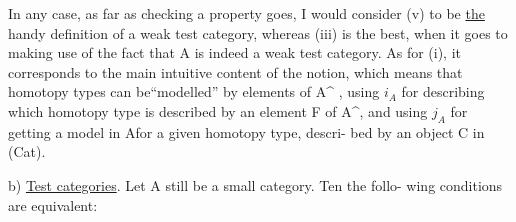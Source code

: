 In any case,  as far as checking a property goes,  I would consider
(v) to be \uline{the} handy definition of a weak test category,  whereas (iii)
is the best,  when it goes to making use of the fact that A is indeed a
weak test category.  As for (i),  
it corresponds to the main intuitive content of the notion,  which means
that homotopy types can be``modelled'' by elements of A\^{}  ,  using
$i_A$ for describing which homotopy type is described by an element F of A\^{},
and using $j_A$ for getting a model in A\hand{$\hat{}$}for a given homotopy type, descri-%
bed by an object C in (Cat).

b)   \uline{Test categories}.  Let A still be a small category.  Ten the follo-%
wing conditions are equivalent:

